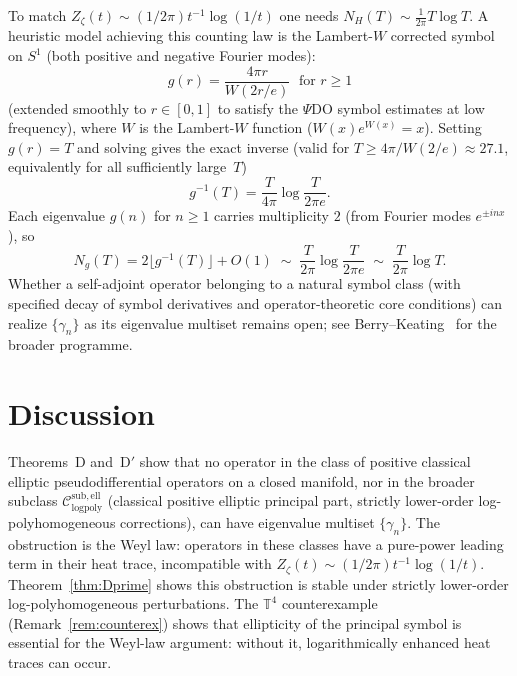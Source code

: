 \documentclass[12pt]{amsart}
\newcommand{\Csub}{\mathcal{C}_{\mathrm{logpoly}}^{\mathrm{sub,ell}}}
\begin{document}
To match $Z_\zeta(t)\sim(1/2\pi)t^{-1}\log(1/t)$ one needs
$N_H(T)\sim\frac{1}{2\pi}T\log T$.
A heuristic model achieving this counting law is the Lambert-$W$
corrected symbol on $S^1$ (both positive and negative Fourier modes):
\[
  g(r)=\frac{4\pi r}{W(2r/e)}\;\text{ for }r\ge 1
\]
(extended smoothly to $r\in[0,1]$ to satisfy the $\Psi$DO symbol
estimates at low frequency), where $W$ is the Lambert-$W$ function
($W(x)e^{W(x)}=x$).  Setting
$g(r)=T$ and solving gives the exact inverse (valid for $T\ge 4\pi/W(2/e)\approx 27.1$,
equivalently for all sufficiently large~$T$)
\[
  g^{-1}(T)=\frac{T}{4\pi}\log\frac{T}{2\pi e}.
\]
Each eigenvalue $g(n)$ for $n\ge 1$ carries multiplicity $2$
(from Fourier modes $e^{\pm inx}$), so
\[
  N_g(T)=2\bigl\lfloor g^{-1}(T)\bigr\rfloor+O(1)
  \;\sim\;\frac{T}{2\pi}\log\frac{T}{2\pi e}
  \;\sim\;\frac{T}{2\pi}\log T.
\]
Whether a self-adjoint operator belonging to a natural symbol class
(with specified decay of symbol derivatives and operator-theoretic
core conditions) can realize $\{\gamma_n\}$ as its eigenvalue multiset
remains open; see Berry--Keating~\cite{BerryKeating1999} for the
broader programme.

\section{Discussion}
\label{sec:discussion}%

Theorems~D and~D$'$ show that no operator in the class of positive
classical elliptic pseudodifferential operators on a closed manifold,
nor in the broader subclass $\Csub$ (classical positive elliptic
principal part, strictly lower-order log-polyhomogeneous corrections),
can have eigenvalue multiset $\{\gamma_n\}$.  The obstruction is the
Weyl law: operators in these classes have a pure-power leading term in
their heat trace, incompatible with
$Z_\zeta(t)\sim(1/2\pi)t^{-1}\log(1/t)$.
Theorem~\ref{thm:Dprime} shows this obstruction is stable under strictly
lower-order log-polyhomogeneous perturbations.
The $\mathbb{T}^4$ counterexample (Remark~\ref{rem:counterex})
shows that ellipticity of the principal symbol is essential for the
Weyl-law argument: without it, logarithmically enhanced heat traces
can occur.
\end{document}
